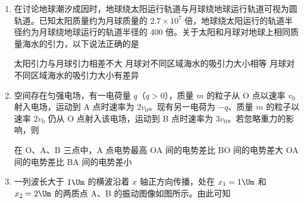 \documentclass[\gkver]{gaokaozhenti}
\begin{document}
\begin{enumerate}
\item
在讨论地球潮汐成因时，地球绕太阳运行轨道与月球绕地球运行轨道可视为圆轨道。已知太阳质量约为月球质量的 $2.7\times10^{7}$ 倍，地球绕太阳运行的轨道半径约为月球绕地球运行的轨道半径的 400 倍。关于太阳和月球对地球上相同质量海水的引力，以下说法正确的是

{太阳引力与月球引力相差不大}
{月球对不同区域海水的吸引力大小相等}
{月球对不同区域海水的吸引力大小有差异}


\item
空间存在匀强电场，有一电荷量 $q$（$q>0$），质量 $m$ 的粒子从 O 点以速率 $v_{0}$ 射入电场，运动到 A 点时速率为 $2v_{0}$。现有另一电荷为 $-q$、质量 $m$ 的粒子以速率 $2v_{0}$ 仍从 O 点射入该电场，运动到 B 点时速率为 $3v_{0}$。若忽略重力的影响，则

{在 O、A、B 三点中，A 点电势最高}
{OA 间的电势差比 BO 间的电势差大}
{OA 间的电势差比 BA 间的电势差小}


\item
一列波长大于 $1\Um$ 的横波沿着 $x$ 轴正方向传播，处在 $x_{1}=1\Um$ 和 $x_{2}=2\Um$ 的两质点 A、B 的振动图像如图所示。由此可知


\end{enumerate}
\end{document}
